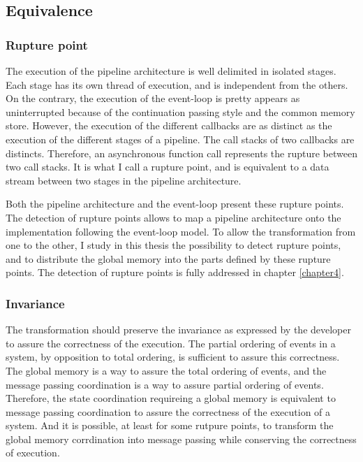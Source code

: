 \subsection{Equivalence}

\subsubsection{Rupture point}

The execution of the pipeline architecture is well delimited in isolated stages.
Each stage has its own thread of execution, and is independent from the others.
On the contrary, the execution of the event-loop is pretty appears as uninterrupted because of the continuation passing style and the common memory store.
However, the execution of the different callbacks are as distinct as the execution of the different stages of a pipeline.
The call stacks of two callbacks are distincts.
Therefore, an asynchronous function call represents the rupture between two call stacks.
It is what I call a rupture point, and is equivalent to a data stream between two stages in the pipeline architecture.

Both the pipeline architecture and the event-loop present these rupture points.
The detection of rupture points allows to map a pipeline architecture onto the implementation following the event-loop model.
To allow the transformation from one to the other, I study in this thesis the possibility to detect rupture points, and to distribute the global memory into the parts defined by these rupture points.
The detection of rupture points is fully addressed in chapter \ref{chapter4}.

\subsubsection{Invariance}


The transformation should preserve the invariance as expressed by the developer to assure the correctness of the execution.
The partial ordering of events in a system, by opposition to total ordering, is sufficient to assure this correctness.
The global memory is a way to assure the total ordering of events, and the message passing coordination is a way to assure partial ordering of events.
Therefore, the state coordination requireing a global memory is equivalent to message passing coordination to assure the correctness of the execution of a system.
And it is possible, at least for some rutpure points, to transform the global memory corrdination into message passing while conserving the correctness of execution.

